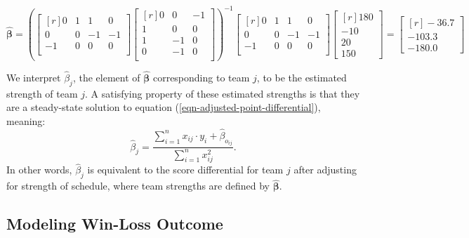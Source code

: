 \documentclass{article}
\begin{document}
\begin{framed}
    $$
      \boldsymbol{\hat\beta} = \left(
        \begin{bmatrix*}[r]
          0 & 1 &  1 &  0\\
          0 & 0 & -1 & -1\\
         -1 & 0 &  0 &  0\\
        \end{bmatrix*}
        \begin{bmatrix*}[r]
          0 &  0 & -1\\
          1 &  0 &  0\\
          1 & -1 &  0\\
          0 & -1 &  0\\
        \end{bmatrix*}
      \right)^{-1}
      \begin{bmatrix*}[r]
        0 & 1 &  1 &  0\\
        0 & 0 & -1 & -1\\
       -1 & 0 &  0 &  0\\
      \end{bmatrix*}
      \begin{bmatrix*}[r] 180 \\ -10 \\ 20 \\ 150 \end{bmatrix*} =
      \begin{bmatrix*}[r] -36.7 \\ -103.3 \\ -180.0 \end{bmatrix*}
    $$
  \end{framed}

  We interpret $\hat\beta_j$, the element of $\boldsymbol{\hat\beta}$ corresponding to team $j$, to be the estimated strength of team $j$. A satisfying property of these estimated strengths is that they are a steady-state solution to equation (\ref{eqn-adjusted-point-differential}), meaning:
  \begin{equation}
    \label{eqn-satisfying-property}
    \hat\beta_j = \frac{
      \sum_{i=1}^n x_{ij} \cdot y_i + \hat\beta_{o_{ij}}
    }{
      \sum_{i=1}^n x_{ij}^2
    }.
  \end{equation}
  In other words, $\hat\beta_j$ is equivalent to the score differential for team $j$ after adjusting for strength of schedule, where team strengths are defined by $\boldsymbol{\hat\beta}$.

  \subsection{\sc Modeling Win-Loss Outcome}
\end{document}

